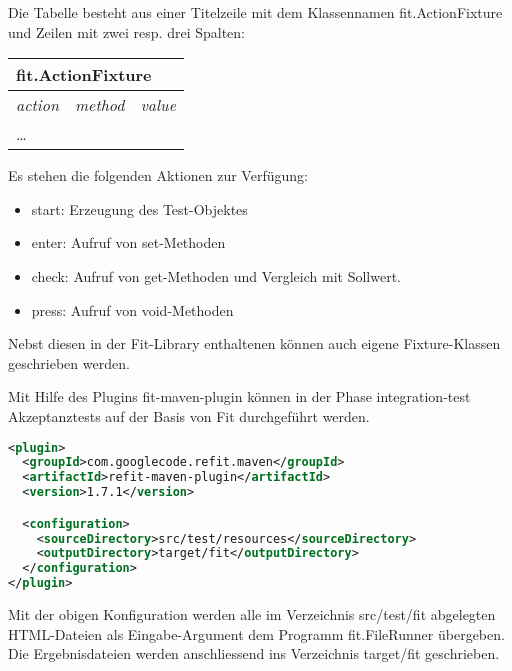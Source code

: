 \begin{itemize}
Die Tabelle besteht aus einer Titelzeile mit dem Klassennamen
fit.ActionFixture und Zeilen mit zwei resp. drei Spalten:
\begin{center}
\begin{tabular}{|l|l|l|}
\hline
\multicolumn{3}{|l|}{\textbf fit.ActionFixture}\\
\hline
{\em action} & {\em method}& {\em value} \\
\ldots &  & \\
\hline
\end{tabular}
\end{center}
Es stehen die folgenden Aktionen zur Verfügung:
\begin{itemize}
\item start: Erzeugung des Test-Objektes
\item enter: Aufruf von set-Methoden
\item check: Aufruf von get-Methoden und Vergleich mit Sollwert.
\item press: Aufruf von void-Methoden
\end{itemize}
\end{itemize}
Nebst diesen in der Fit-Library enthaltenen können auch eigene Fixture-Klassen
geschrieben werden.
%
\newslide

Mit Hilfe des Plugins fit-maven-plugin können in der Phase
integration-test Akzeptanztests auf der Basis von Fit durchgeführt werden.
\begin{lstlisting}[language=xml,
morekeywords={plugin,groupId,artifactId,configuration,sourceDirectory,outputDirectory}]
<plugin>
  <groupId>com.googlecode.refit.maven</groupId>
  <artifactId>refit-maven-plugin</artifactId>
  <version>1.7.1</version>

  <configuration>
    <sourceDirectory>src/test/resources</sourceDirectory>
    <outputDirectory>target/fit</outputDirectory>
  </configuration>
</plugin>
\end{lstlisting}
Mit der obigen Konfiguration werden alle im Verzeichnis src/test/fit
abgelegten HTML-Dateien als Eingabe-Argument
 dem Programm fit.FileRunner übergeben. Die Ergebnisdateien werden
 anschliessend ins Verzeichnis target/fit geschrieben.
\newslide
